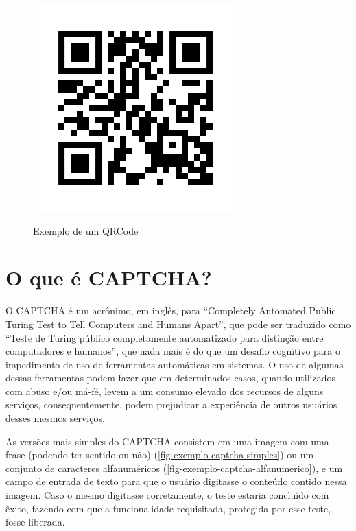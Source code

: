 \begin{figure}[h]
    \centering
    \caption{Exemplo de um QRCode}
    \includegraphics[scale=0.5]{tcc/figures/exemplo-qrcode.png}
    \label{fig-exemplo-qrcode}
\end{figure}

\section{O que é CAPTCHA?}
\label{secao-captcha-definicao}

O CAPTCHA\cite{captchaWikipedia} é um acrônimo, em inglês, para ``Completely Automated Public Turing Test to Tell Computers and Humans Apart'', que pode ser traduzido como ``Teste de Turing público completamente automatizado para distinção entre computadores e humanos'', que nada mais é do que um desafio cognitivo para o impedimento de uso de ferramentas automáticas em sistemas. O uso de algumas dessas ferramentas podem fazer que em determinados casos, quando utilizados com abuso e/ou má-fé, levem a um consumo elevado dos recursos de alguns serviços, consequentemente, podem prejudicar a experiência de outros usuários desses mesmos serviços.

As versões mais simples do CAPTCHA consistem em uma imagem com uma frase (podendo ter sentido ou não) (\autoref{fig-exemplo-captcha-simples}) ou um conjunto de caracteres alfanuméricos \cite{captchaTecmundo} (\autoref{fig-exemplo-captcha-alfanumerico}), e um campo de entrada de texto para que o usuário digitasse o conteúdo contido nessa imagem. Caso o mesmo digitasse corretamente, o teste estaria concluído com êxito, fazendo com que a funcionalidade requisitada, protegida por esse teste, fosse liberada.

